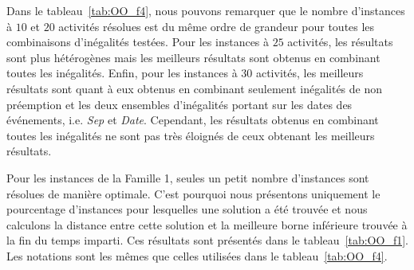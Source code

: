 Dans le tableau~\ref{tab:OO_f4}, nous pouvons remarquer que le nombre
d'instances à $10$ et $20$ activités résolues est du même ordre de
grandeur pour toutes les combinaisons d'inégalités testées. Pour les
instances à $25$ activités, les résultats sont plus hétérogènes mais
les meilleurs résultats sont obtenus en combinant toutes les
inégalités. Enfin, pour les instances à $30$ activités, les meilleurs
résultats sont quant à eux obtenus en combinant seulement inégalités
de non préemption et les deux ensembles d'inégalités portant sur les
dates des événements, i.e. {\it Sep} et {\it Date}. Cependant, les
résultats obtenus en combinant toutes les inégalités ne sont pas très
éloignés de ceux obtenant les meilleurs résultats.

Pour les instances de la Famille 1, seules un petit nombre
d'instances sont résolues de manière optimale. C'est pourquoi nous
présentons uniquement le pourcentage d'instances pour lesquelles une
solution a été trouvée et nous calculons la distance entre cette
solution et la meilleure borne inférieure trouvée à la fin du temps
imparti. Ces résultats sont présentés dans le
tableau~\ref{tab:OO_f1}. Les notations sont les mêmes que celles
utilisées dans le tableau~\ref{tab:OO_f4}.

